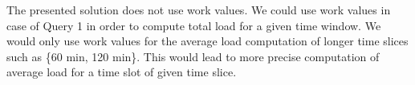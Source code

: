 The presented solution does not use work values.
We could use work values in case of Query 1 in order to compute total load for a given time window.
We would only use work values for the average load computation of longer time slices such as \{60 min, 120 min\}. This would lead to more precise computation of average load for a time slot of given time slice.
